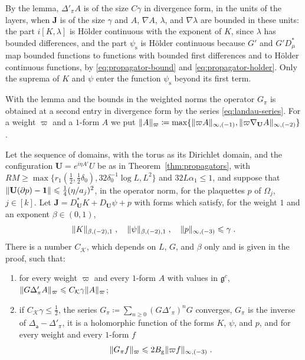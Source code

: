 \documentclass[11pt]{preprint}
\newcommand{\id}{\mathbf 1}
\DeclarePairedDelimiter{\norm}{\lVert}{\rVert}
\numberwithin{equation}{section}
\begin{document}
By the lemma, $\Delta'_\pi A$ is of the size $C\gamma$ in divergence form, in the units of the layers, when $\mathbf J$ is of the size $\gamma$ and $A$, $\nabla A$, $\lambda$, and $\nabla\lambda$ are bounded in these units: the part $i[K, \lambda]$ is H\"older continuous with the exponent of $K$, since $\lambda$ has bounded differences, and the part $\psi_{\mathrm s}$ is H\"older continuous because $G'$ and $G'D^*_\mu$ map bounded functions to functions with bounded first differences and to H\"older continuous functions, by \eqref{eq:propagator-bound} and \eqref{eq:propagator-holder}. Only the suprema of $K$ and $\psi$ enter the function $\psi_{\mathrm s}$ beyond its first term.

With the lemma and the bounds in the weighted norms the operator $G_\pi$ is obtained at a second entry in divergence form by the series \eqref{eq:landau-series}. For a weight $\varpi$ and a $1$-form $A$ we put $\norm A_\varpi \coloneqq \max\{ \norm{\varpi A}_{\infty,(-1)}, \norm{\varpi\nabla_{\mathbf U}A}_{\infty,(-2)} \}$.

\begin{proposition}\label{prop:landau-divergence}
Let the sequence of domains, with the torus as its Dirichlet domain, and the configuration $\mathbf U = e^{i\eta A'}U$ be as in Theorem~\ref{thm:propagators}, with $RM \geqslant \max\{ r_1(\frac{1}{2}, \frac{1}{2}\delta_0), 32\delta_0^{-1}\log L, L^2 \}$ and $32L\alpha_1 \leqslant 1$, and suppose that $\norm{\mathbf U(\partial p) - \id} \leqslant \frac{1}{4}(\eta/a_j)^2$, in the operator norm, for the plaquettes $p$ of $\Omega_j$, $j \in [k]$. Let $\mathbf J = D^*_{\mathbf U}K + D_{\mathbf U}\psi + p$ with forms which satisfy, for the weight $1$ and an exponent $\beta \in (0, 1)$,
\begin{equation}\label{eq:divergence-size-local}
    \norm K_{\beta,(-2),1}\;,\quad
    \norm\psi_{\beta,(-2),1}\;,\quad
    \norm p_{\infty,(-3)} \leqslant \gamma\;.
\end{equation}
There is a number $C_{\mathcal K}$, which depends on $L$, $G$, and $\beta$ only and is given in the proof, such that:
\begin{enumerate}[label=(\roman*)]
\item for every weight $\varpi$ and every $1$-form $A$ with values in $\mathfrak g^c$, $\norm{G\Delta'_\pi A}_\varpi \leqslant C_{\mathcal K}\gamma\norm A_\varpi$;
\item if $C_{\mathcal K}\gamma \leqslant \frac{1}{2}$, the series $G_\pi \coloneqq \sum_{n \geqslant 0}(G\Delta'_\pi)^nG$ converges, $G_\pi$ is the inverse of $\Delta_{\mathsf a} - \Delta'_\pi$, it is a holomorphic function of the forms $K$, $\psi$, and $p$, and for every weight and every $1$-form $f$
\begin{equation}\label{eq:landau-divergence}
    \norm{G_\pi f}_\varpi \leqslant 2B_{\mathrm g}\norm{\varpi f}_{\infty,(-3)}\;.
\end{equation}
\end{enumerate}
\end{proposition}
\end{document}
